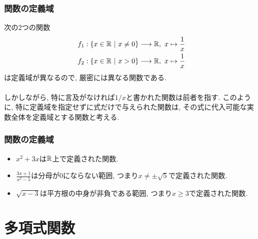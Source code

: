 

\begin{frame}
\frametitle{関数の定義域}

次の2つの関数
\begin{align*}
f_1: \{ x \in \mathbb{R} \ | \ x \neq 0\} \longrightarrow \mathbb{R}, \ x \mapsto \frac{1}{x}\\
f_2: \{ x \in \mathbb{R} \ | \ x > 0\} \longrightarrow \mathbb{R}, \ x \mapsto \frac{1}{x}
\end{align*}
は定義域が異なるので, 厳密には異なる関数である. \\
\ \\

しかしながら, 特に言及がなければ$1/x$と書かれた関数は前者を指す. 
このように, 特に定義域を指定せずに式だけで与えられた関数は, その式に代入可能な実数全体を定義域とする関数と考える.


\end{frame}




\begin{frame}
\frametitle{関数の定義域}

\begin{itemize}
\item $x^2 + 3x$は$\mathbb{R}$上で定義された関数. 
\item $\frac{3x+1}{x^2-5}$は分母が$0$にならない範囲, つまり$x\neq \pm \sqrt{5}$で定義された関数. 
\item $\sqrt{x-3}$は平方根の中身が非負である範囲, つまり$x\ge 3$で定義された関数. 
\end{itemize}

\end{frame}



\section{多項式関数}


